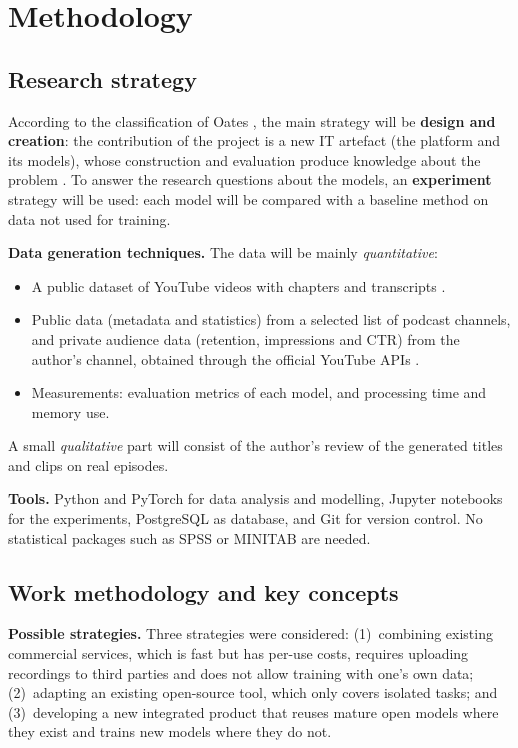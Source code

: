 \documentclass[ENG]{TFUOC}
\begin{document}
\section{Methodology}

\subsection{Research strategy}

According to the classification of Oates \cite{oates2006researching}, the main strategy will be \textbf{design and creation}: the contribution of the project is a new IT artefact (the platform and its models), whose construction and evaluation produce knowledge about the problem \cite{hevner2004design}. To answer the research questions about the models, an \textbf{experiment} strategy will be used: each model will be compared with a baseline method on data not used for training.

\textbf{Data generation techniques.} The data will be mainly \textit{quantitative}:
\begin{itemize}
\item A public dataset of YouTube videos with chapters and transcripts \cite{yang2023vidchapters}.
\item Public data (metadata and statistics) from a selected list of podcast channels, and private audience data (retention, impressions and CTR) from the author's channel, obtained through the official YouTube APIs \cite{yt_data_api}.
\item Measurements: evaluation metrics of each model, and processing time and memory use.
\end{itemize}
A small \textit{qualitative} part will consist of the author's review of the generated titles and clips on real episodes.

\textbf{Tools.} Python and PyTorch for data analysis and modelling, Jupyter notebooks for the experiments, PostgreSQL as database, and Git for version control. No statistical packages such as SPSS or MINITAB are needed.

\subsection{Work methodology and key concepts}

\textbf{Possible strategies.} Three strategies were considered: (1)~combining existing commercial services, which is fast but has per-use costs, requires uploading recordings to third parties and does not allow training with one's own data; (2)~adapting an existing open-source tool, which only covers isolated tasks; and (3)~developing a new integrated product that reuses mature open models where they exist and trains new models where they do not.
\end{document}
